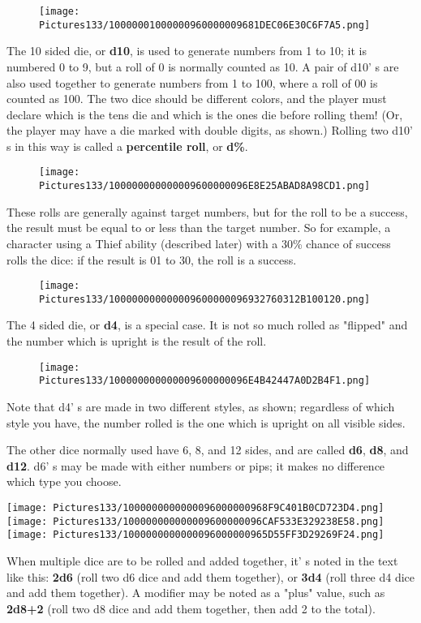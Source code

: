 \documentclass[a4paper,twoside,openany,10pt]{book}
\begin{document}
\begin{multicols}{2}
\begin{wrapfigure}{r}{1.77cm}
\texttt{[image: Pictures133/10000001000000960000009681DEC06E30C6F7A5.png]}
\end{wrapfigure}
The 10 sided die, or \textbf{d10}, is used to generate numbers from 1 to 10; it is numbered 0 to 9, but a roll of 0 is normally counted as 10. A pair of d10' s are also used together to generate numbers from 1 to 100, where a roll of 00 is counted as 100. The two dice should be different colors, and the player must declare which is the tens die and which is the ones die before rolling them! (Or, the player may have a die marked with double digits, as shown.) Rolling two d10' s in this way is called a \textbf{percentile roll}, or \textbf{d\%}.

\begin{wrapfigure}{r}{1.77cm}
	\texttt{[image: Pictures133/100000000000009600000096E8E25ABAD8A98CD1.png]}
\end{wrapfigure}
These rolls are generally against target numbers, but for the roll to be a success, the result must be equal to or less than the target number. So for example, a character using a Thief ability (described later) with a 30\% chance of success rolls the dice: if the result is 01 to 30, the roll is a success.
\begin{wrapfigure}{r}{1.77cm}
\texttt{[image: Pictures133/100000000000009600000096932760312B100120.png]}
\end{wrapfigure}

The 4 sided die, or \textbf{d4}, is a special case. It is not so much rolled as "flipped" and the number which is upright is the result of the roll.
\begin{wrapfigure}{r}{1.77cm}
\texttt{[image: Pictures133/100000000000009600000096E4B42447A0D2B4F1.png]}	
\end{wrapfigure}
Note that d4' s are made in two different styles, as shown; regardless of which style you have, the number rolled is the one which is upright on all visible sides.

The other dice normally used have 6, 8, and 12 sides, and are called \textbf{d6}, \textbf{d8}, and \textbf{d12}. d6' s may be made with either numbers or pips; it makes no difference which type you choose. 

\texttt{[image: Pictures133/1000000000000096000000968F9C401B0CD723D4.png]}
\texttt{[image: Pictures133/100000000000009600000096CAF533E329238E58.png]}
\texttt{[image: Pictures133/1000000000000096000000965D55FF3D29269F24.png]}

When multiple dice are to be rolled and added together, it' s noted in the text like this: \textbf{2d6} (roll two d6 dice and add them together), or  \textbf{3d4} (roll three d4 dice and add them together). A modifier may be noted as a "plus" value, such as \textbf{2d8+2} (roll two d8 dice and add them together, then add 2 to the total).

\end{multicols}
\end{document}
